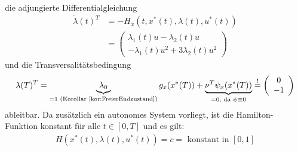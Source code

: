 die adjungierte Differentialgleichung 
\begin{align}
	\dot{\lambda}(t)^T	&= - H_x(t,x^*(t),\lambda(t),u^*(t))\\
											    &= \left(\begin{array}{c} 	 \lambda_1(t) u  - \lambda_2(t) u\\
																			 								-\lambda_1(t) u^2  + 3 \lambda_2(t) u^2 \end{array}\right)
\end{align}
und die Transversalitätsbedingung
\begin{align}
	\lambda(T)^T = \underbrace{\lambda_0}_{=1 \text{ (Korollar \ref{kor:FreierEndzustand})}}g_x(x^*(T))+\underbrace{\nu^T\psi_x(x^*(T))}_{=0, \text{ da } \psi \equiv  0} \overset{!}{=}  \left(\begin{array}{c} 0\\-1\end{array}\right)
\end{align}
ableitbar. Da zusätzlich ein autonomes System vorliegt, ist die Hamilton-Funktion konstant für alle $t \in [0,T]$ und es gilt:
\begin{align}
	H(x^*(t),\lambda(t), u^*(t)) = c = \text{ konstant in } [0,1]
\end{align}

